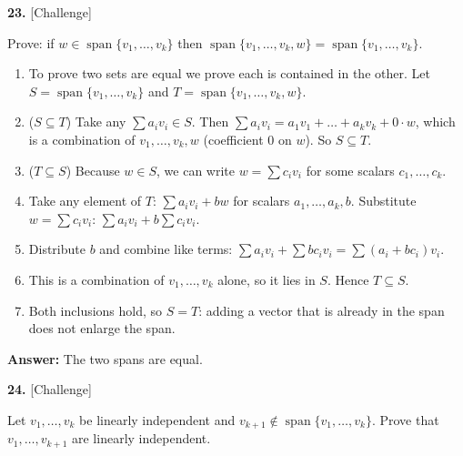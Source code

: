 \documentclass[11pt]{article}
\begin{document}
\par\vspace{2pt}
\begin{minipage}{\linewidth}\textbf{23.} \hfill{\scriptsize\color{ink}[Challenge]}\par\nopagebreak Prove: if $w\in\operatorname{span}\{v_1,\dots,v_k\}$ then $\operatorname{span}\{v_1,\dots,v_k,w\}=\operatorname{span}\{v_1,\dots,v_k\}$.
\end{minipage}\par\nopagebreak
\begin{tcolorbox}[breakable,colback=ans,colframe=ansb,boxrule=0.5pt,left=4pt,right=4pt,top=2pt,bottom=2pt]\begin{enumerate}[leftmargin=2.2em,itemsep=1pt,topsep=1pt,label=\textbf{Step \arabic*.}]\item To prove two sets are equal we prove each is contained in the other. Let $S=\operatorname{span}\{v_1,\dots,v_k\}$ and $T=\operatorname{span}\{v_1,\dots,v_k,w\}$.
\item ($S\subseteq T$) Take any $\sum a_iv_i\in S$. Then $\sum a_iv_i=a_1v_1+\dots+a_kv_k+0\cdot w$, which is a combination of $v_1,\dots,v_k,w$ (coefficient $0$ on $w$). So $S\subseteq T$.
\item ($T\subseteq S$) Because $w\in S$, we can write $w=\sum c_iv_i$ for some scalars $c_1,\dots,c_k$.
\item Take any element of $T$: $\sum a_iv_i+bw$ for scalars $a_1,\dots,a_k,b$. Substitute $w=\sum c_iv_i$: $\sum a_iv_i+b\sum c_iv_i$.
\item Distribute $b$ and combine like terms: $\sum a_iv_i+\sum bc_iv_i=\sum(a_i+bc_i)v_i$.
\item This is a combination of $v_1,\dots,v_k$ alone, so it lies in $S$. Hence $T\subseteq S$.
\item Both inclusions hold, so $S=T$: adding a vector that is already in the span does not enlarge the span.
\end{enumerate}\textbf{Answer:} The two spans are equal.\end{tcolorbox}
\par\vspace{2pt}
\begin{minipage}{\linewidth}\textbf{24.} \hfill{\scriptsize\color{ink}[Challenge]}\par\nopagebreak Let $v_1,\dots,v_k$ be linearly independent and $v_{k+1}\notin\operatorname{span}\{v_1,\dots,v_k\}$. Prove that $v_1,\dots,v_{k+1}$ are linearly independent.
\end{minipage}\par\nopagebreak
\end{document}
